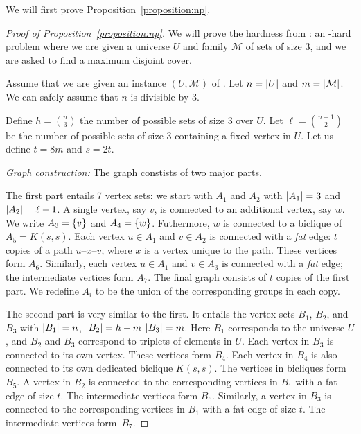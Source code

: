 
We will first prove Proposition~\ref{proposition:np}.

\begin{proof}[Proof of Proposition~\ref{proposition:np}]
We will prove the hardness from \tmatch: an \np-hard problem where we are given
a universe $U$ and family $\mathcal{M}$ of sets of size $3$, and we are asked
to find a maximum disjoint cover. 

Assume that we are given an instance $(U, \mathcal{M})$ of \tmatch.  Let $n =
{\left|U\right|}$ and $m = {\left|\mathcal{M}\right|}$. We can safely assume that $n$ is divisible by 3.

Define $h = {n \choose 3}$ the number of possible
sets of size $3$ over $U$. Let $\ell = {n - 1 \choose 2}$ be the number of possible
sets of size $3$ containing a fixed vertex in $U$.
Let us define $t = 8m$ and $s = 2t$.

\emph{Graph construction:}
The graph constists of two major parts.

The first part entails 7 vertex sets: we start with $A_1$ and $A_2$ with ${\left|A_1\right|} = 3$ and ${\left|A_2\right|}
= \ell - 1$.
A single vertex, say $v$, 
is connected to an additional vertex, say $w$. We write $A_3 = \left\{v\right\}$ and $A_4 = \left\{w\right\}$.
Futhermore, $w$ is connected to a biclique of $A_5 = K(s, s)$.
%
Each vertex $u \in A_1$ and $v \in A_2$ is connected with a \emph{fat} edge:
$t$ copies of a path $u$--$x$--$v$, where $x$ is a vertex unique to the path.
These vertices form $A_6$.
Similarly, each vertex $u \in A_1$ and $v \in A_3$ is connected with a \emph{fat} edge;
the intermediate vertices form $A_7$.
%
%
The final graph consists of $t$ copies of the first part. We redefine $A_i$ to be
the union of the corresponding groups in each copy.

The second part is very similar to the first.  It entails the vertex sets
$B_1$, $B_2$, and $B_3$ with ${\left|B_1\right|} = n$, ${\left|B_2\right|} = h - m$ ${\left|B_3\right|} = m$.
Here $B_1$ corresponds to the universe $U$, and $B_2$ and $B_3$ correspond to
triplets of elements in $U$. Each vertex in $B_3$ is connected to its own vertex.
These vertices form $B_4$. Each vertex in $B_4$ is also connected to its own dedicated biclique
$K(s, s)$. The vertices in bicliques form $B_5$.
A vertex in $B_2$ is connected to the corresponding vertices in $B_1$ with a fat edge
of size $t$. The intermediate vertices form $B_6$.
Similarly, a vertex in $B_3$ is connected to the corresponding vertices in $B_1$ with a fat edge
of size $t$. The intermediate vertices form~$B_7$.




\end{proof}
